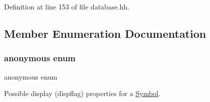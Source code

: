 Definition at line 153 of file database.\+hh.



\subsection{Member Enumeration Documentation}
\mbox{\label{class_symbol_ab1ec802c89320587a8c3a59bfa4fa803}} 
\subsubsection{\texorpdfstring{anonymous enum}{anonymous enum}}
{\footnotesize\ttfamily anonymous enum}



Possible display (dispflag) properties for a \mbox{\hyperlink{class_symbol}{Symbol}}. 

